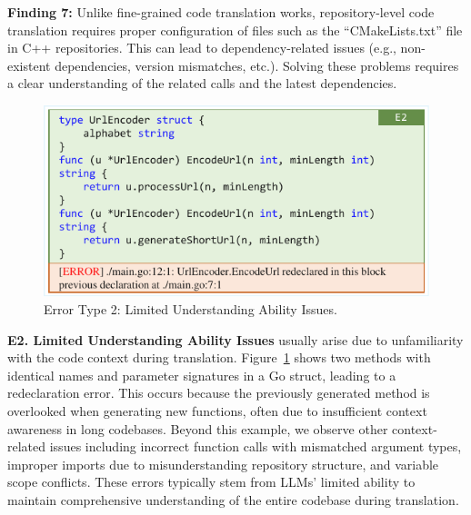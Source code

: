 \secmargin
\begin{myboxc} \textbf{Finding 7: } %
Unlike fine-grained code translation works, repository-level code translation requires proper configuration of files such as the “CMakeLists.txt” file in C++ repositories. This can lead to dependency-related issues (e.g., non-existent dependencies, version mismatches, etc.). Solving these problems requires a clear understanding of the related calls and the latest dependencies.
\end{myboxc} %
\secmargin


\begin{figure}
    \centering
    \includegraphics[width=\linewidth]{figures/E2.pdf}
    \figmargin
    \caption{Error Type 2: Limited Understanding Ability Issues.}
    \figmargin
    \label{fig:ErrorType2}
\end{figure}


\textbf{E2. Limited Understanding Ability Issues} usually arise due to unfamiliarity with the code context during translation.
Figure~\ref{fig:ErrorType2} shows two methods with identical names and parameter signatures in a Go struct, leading to a redeclaration error. This occurs because the previously generated method is overlooked when generating new functions, often due to insufficient context awareness in long codebases.
Beyond this example, we observe other context-related issues including incorrect function calls with mismatched argument types, improper imports due to misunderstanding repository structure, and variable scope conflicts. These errors typically stem from LLMs' limited ability to maintain comprehensive understanding of the entire codebase during translation.

